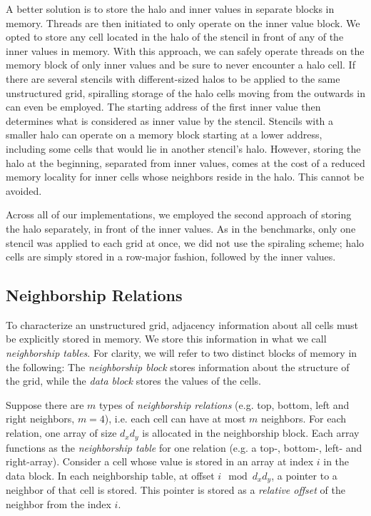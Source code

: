 A better solution is to store the halo and inner values in separate blocks in memory. Threads are then initiated to only operate on the inner value block. We opted to store any cell located in the halo of the stencil in front of any of the inner values in memory. With this approach, we can safely operate threads on the memory block of only inner values and be sure to never encounter a halo cell. If there are several stencils with different-sized halos to be applied to the same unstructured grid, spiralling storage of the halo cells moving from the outwards in can even be employed. The starting address of the first inner value then determines what is considered as inner value by the stencil. Stencils with a smaller halo can operate on a memory block starting at a lower address, including some cells that would lie in another stencil's halo. However, storing the halo at the beginning, separated from inner values, comes at the cost of a reduced memory locality for inner cells whose neighbors reside in the halo. This cannot be avoided.

Across all of our implementations, we employed the second approach of storing the halo separately, in front of the inner values. As in the benchmarks, only one stencil was applied to each grid at once, we did not use the spiraling scheme; halo cells are simply stored in a row-major fashion, followed by the inner values.

\subsection{Neighborship Relations}
\label{sec:unstructured-neighborships}

To characterize an unstructured grid, adjacency information about all cells must be explicitly stored in memory. We store this information in what we call \emph{neighborship tables}.  For clarity, we will refer to two distinct blocks of memory in the following: The \emph{neighborship block} stores information about the structure of the grid, while the \emph{data block} stores the values of the cells.

Suppose there are $m$ types of \emph{neighborship relations} (e.g. top, bottom, left and right neighbors, $m=4$), i.e. each cell can have at most $m$ neighbors. For each relation, one array of size $d_xd_y$ is allocated in the neighborship block. Each array functions as the \emph{neighborship table} for one relation (e.g. a top-, bottom-, left- and right-array). Consider a cell whose value is stored in an array at index $i$ in the data block. In each neighborship table, at offset $i \mod d_xd_y$, a pointer to a neighbor of that cell is stored. This pointer is stored as a \emph{relative offset} of the neighbor from the index $i$.

